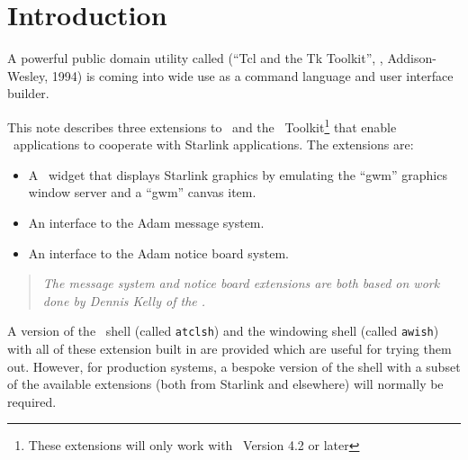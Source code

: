 \stardocabstract
 \newpage
 \begin{latexonly}
   \setlength{\parskip}{0mm}
   \latexonlytoc
   \setlength{\parskip}{\medskipamount}
   \markboth{\stardocname}{\stardocname}
 \end{latexonly}
\cleardoublepage
\renewcommand{\thepage}{\arabic{page}}
\setcounter{page}{1}

\section{\label{introduction}Introduction}

A powerful public domain utility called
 (``Tcl and the Tk
Toolkit'', ,
Addison-Wesley, 1994) is coming into wide use as a command language and
user interface builder.

This note describes three extensions to \Tcl\ and the \Tk\ Toolkit\footnote{
These extensions will only work with \Tk\ Version 4.2 or later} that
enable \TclTk\ applications to cooperate with Starlink applications. The
extensions are:

\begin{itemize}
\item A \Tk\ widget that displays Starlink graphics by emulating the ``gwm''
graphics window server and a ``gwm'' canvas item.
\item An interface to the Adam message system.
\item An interface to the Adam notice board system.
\end{itemize}

\begin{quote}
{\em The message system and notice board extensions are both based on work
done by Dennis Kelly of the
.  }
\end{quote}

A version of the \Tcl\ shell (called {\tt{atclsh}}) and the windowing
shell (called {\tt{awish}}) with all of these extension built in are
provided which are useful for trying them out. However, for production
systems, a bespoke version of the shell with a subset of the available
extensions (both from Starlink and elsewhere) will normally be
required.

